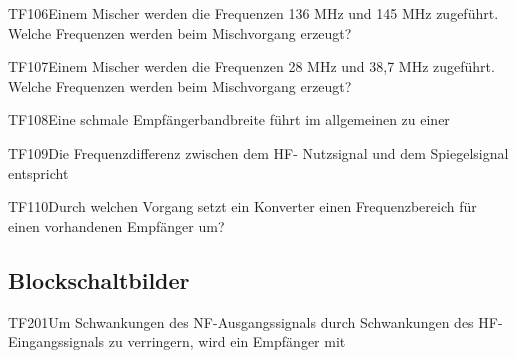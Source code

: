 \begin{question}{TF106}{Einem Mischer werden die Frequenzen 136 MHz und 145 MHz zugeführt. Welche Frequenzen werden beim Mischvorgang erzeugt?}
\end{question}

\begin{question}{TF107}{Einem Mischer werden die Frequenzen 28 MHz und 38,7 MHz zugeführt. Welche Frequenzen werden beim Mischvorgang erzeugt?}
\end{question}

\begin{question}{TF108}{Eine schmale Empfängerbandbreite führt im allgemeinen zu einer}
\end{question}

\begin{question}{TF109}{Die Frequenzdifferenz zwischen dem HF- Nutzsignal und dem Spiegelsignal entspricht}
\end{question}

\begin{question}{TF110}{Durch welchen Vorgang setzt ein Konverter einen Frequenzbereich für einen vorhandenen Empfänger um?}
\end{question}

\subsection{Blockschaltbilder}

\begin{question}{TF201}{Um Schwankungen des NF-Ausgangssignals durch Schwankungen des HF-Eingangssignals zu verringern, wird ein Empfänger mit}
\end{question}

